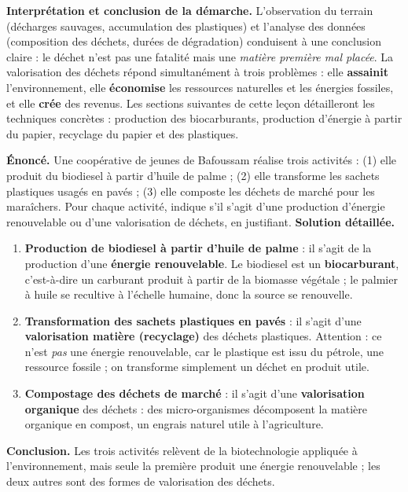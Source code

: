 \documentclass[11pt]{article}
\begin{document}
\textbf{Interprétation et conclusion de la démarche.} L'observation du terrain (décharges sauvages, accumulation des plastiques) et l'analyse des données (composition des déchets, durées de dégradation) conduisent à une conclusion claire : le déchet n'est pas une fatalité mais une \emph{matière première mal placée}. La valorisation des déchets répond simultanément à trois problèmes : elle \textbf{assainit} l'environnement, elle \textbf{économise} les ressources naturelles et les énergies fossiles, et elle \textbf{crée} des revenus. Les sections suivantes de cette leçon détailleront les techniques concrètes : production des biocarburants, production d'énergie à partir du papier, recyclage du papier et des plastiques.

\begin{exoresolu}
\textbf{Énoncé.} Une coopérative de jeunes de Bafoussam réalise trois activités : (1) elle produit du biodiesel à partir d'huile de palme ; (2) elle transforme les sachets plastiques usagés en pavés ; (3) elle composte les déchets de marché pour les maraîchers. Pour chaque activité, indique s'il s'agit d'une production d'énergie renouvelable ou d'une valorisation de déchets, en justifiant.
\tcblower
\textbf{Solution détaillée.}
\begin{enumerate}
\item \textbf{Production de biodiesel à partir d'huile de palme} : il s'agit de la production d'une \textbf{énergie renouvelable}. Le biodiesel est un \textbf{biocarburant}, c'est-à-dire un carburant produit à partir de la biomasse végétale ; le palmier à huile se recultive à l'échelle humaine, donc la source se renouvelle.
\item \textbf{Transformation des sachets plastiques en pavés} : il s'agit d'une \textbf{valorisation matière (recyclage)} des déchets plastiques. Attention : ce n'est \emph{pas} une énergie renouvelable, car le plastique est issu du pétrole, une ressource fossile ; on transforme simplement un déchet en produit utile.
\item \textbf{Compostage des déchets de marché} : il s'agit d'une \textbf{valorisation organique} des déchets : des micro-organismes décomposent la matière organique en compost, un engrais naturel utile à l'agriculture.
\end{enumerate}
\textbf{Conclusion.} Les trois activités relèvent de la biotechnologie appliquée à l'environnement, mais seule la première produit une énergie renouvelable ; les deux autres sont des formes de valorisation des déchets.
\end{exoresolu}
\end{document}
